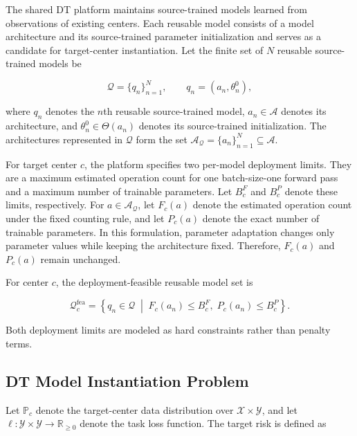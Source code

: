 \documentclass[a4paper,fleqn]{cas-sc}
\begin{document}
The shared DT platform maintains source-trained models learned from observations
of existing centers. Each reusable model consists of a model architecture
and its source-trained parameter initialization and serves as a candidate for
target-center instantiation. Let the finite set of $N$ reusable source-trained
models be

\begin{equation}
\mathcal{Q}=\{q_n\}_{n=1}^{N},
\qquad
q_n=(a_n,\theta_n^0),
\label{eq:reusable-models}
\end{equation}

where $q_n$ denotes the $n$th reusable source-trained model,
$a_n\in\mathcal{A}$ denotes its architecture, and
$\theta_n^0\in\Theta(a_n)$ denotes its source-trained initialization. The
architectures represented in $\mathcal{Q}$ form the set
$\mathcal{A}_{\mathcal{Q}}=\{a_n\}_{n=1}^{N}\subseteq\mathcal{A}$.

For target center $c$, the platform specifies two per-model deployment
limits. They are a maximum estimated operation count for one batch-size-one
forward pass and a maximum number of trainable parameters. Let $B_c^{F}$ and $B_c^{P}$
denote these limits, respectively. For $a\in\mathcal{A}_{\mathcal{Q}}$, let
$F_c(a)$ denote the estimated operation count under the fixed counting rule,
and let $P_c(a)$ denote the exact number of trainable parameters. In this
formulation, parameter adaptation changes only parameter values while keeping
the architecture fixed. Therefore, $F_c(a)$ and $P_c(a)$ remain unchanged.

For center $c$, the deployment-feasible reusable model set is

\begin{equation}
\mathcal{Q}_{c}^{\mathrm{fea}}
=
\left\{
q_n\in\mathcal{Q}
\;\middle|\;
F_c(a_n)\leq B_c^{F},
\;
P_c(a_n)\leq B_c^{P}
\right\}.
\label{eq:feasible-candidate-set}
\end{equation}

Both deployment limits are modeled as hard constraints rather than penalty
terms.

\subsection{DT Model Instantiation Problem}

Let $\mathbb{P}_c$ denote the target-center data distribution over
$\mathcal{X}\times\mathcal{Y}$, and let
$\ell:\mathcal{Y}\times\mathcal{Y}\rightarrow\mathbb{R}_{\geq 0}$ denote the
task loss function. The target risk is defined as
\end{document}
